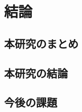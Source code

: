 \chapter{結論}
\label{chap:conclusion}

\section{本研究のまとめ}
\label{section:conclusion}

\section{本研究の結論}


\section{今後の課題}
